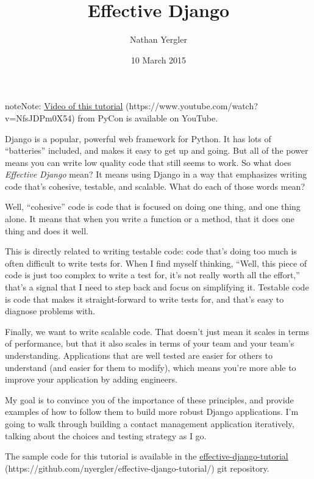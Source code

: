 \documentclass[letterpaper,10pt,english]{sphinxmanual}
\title{Effective Django}
\date{10 March 2015}
\author{Nathan Yergler}
\begin{document}
\maketitle
\tableofcontents
{}\label{tutorial/index::doc}


\begin{notice}{note}{Note:}
\href{https://www.youtube.com/watch?v=NfsJDPm0X54}{Video of this tutorial} (https://www.youtube.com/watch?v=NfsJDPm0X54) from PyCon is available on YouTube.
\end{notice}

Django is a popular, powerful web framework for Python. It has lots of
``batteries'' included, and makes it easy to get up and going. But all
of the power means you can write low quality code that still seems to
work. So what does \emph{Effective Django} mean? It means using Django in a
way that emphasizes writing code that's cohesive, testable, and
scalable. What do each of those words mean?

Well, ``cohesive'' code is code that is focused on doing one thing, and
one thing alone. It means that when you write a function or a method,
that it does one thing and does it well.

This is directly related to writing testable code: code that's doing
too much is often difficult to write tests for. When I find myself
thinking, ``Well, this piece of code is just too complex to write a
test for, it's not really worth all the effort,'' that's a signal that
I need to step back and focus on simplifying it. Testable code is code
that makes it straight-forward to write tests for, and that's easy to
diagnose problems with.

Finally, we want to write scalable code. That doesn't just mean it
scales in terms of performance, but that it also scales in terms of
your team and your team's understanding. Applications that are well
tested are easier for others to understand (and easier for them to
modify), which means you're more able to improve your application by
adding engineers.

My goal is to convince you of the importance of these principles, and
provide examples of how to follow them to build more robust Django
applications. I'm going to walk through building a contact management
application iteratively, talking about the choices and testing
strategy as I go.

The sample code for this tutorial is available in the
\href{https://github.com/nyergler/effective-django-tutorial/}{effective-django-tutorial} (https://github.com/nyergler/effective-django-tutorial/) git repository.
\end{document}

